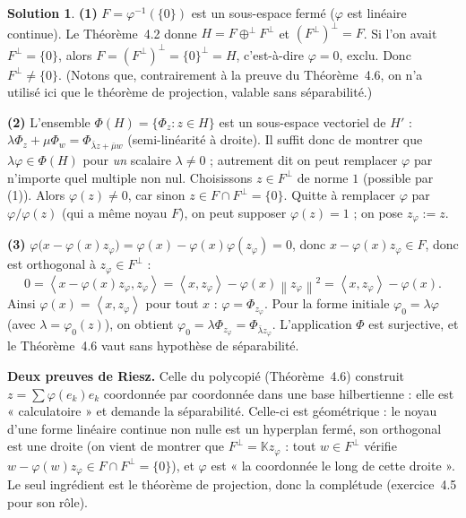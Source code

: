 \documentclass[11pt,a4paper]{article}
\newcommand{\K}{\mathbb{K}}
\newcommand{\norm}[1]{\left\|#1\right\|}
\newcommand{\ie}{c'est-à-dire}
\newcommand{\ps}[2]{\left\langle #1,#2\right\rangle}
\theoremstyle{definition}
\newtheorem*{solution}{Solution}
\begin{document}
\begin{solution}
\noindent\textbf{(1)} $F=\varphi^{-1}(\{0\})$ est un sous-espace fermé ($\varphi$ est linéaire continue). Le Théorème~4.2 donne $H=F\oplus^\perp F^\perp$ et $(F^\perp)^\perp=F$. Si l'on avait $F^\perp=\{0\}$, alors $F=(F^\perp)^\perp=\{0\}^\perp=H$, \ie{} $\varphi=0$, exclu. Donc $F^\perp\ne\{0\}$. (Notons que, contrairement à la preuve du Théorème~4.6, on n'a utilisé ici que le théorème de projection, valable sans séparabilité.)

\medskip
\noindent\textbf{(2)} L'ensemble $\Phi(H)=\{\Phi_z:z\in H\}$ est un sous-espace vectoriel de $H'$ : $\lambda\Phi_z+\mu\Phi_w=\Phi_{\bar\lambda z+\bar\mu w}$ (semi-linéarité à droite). Il suffit donc de montrer que $\lambda\varphi\in\Phi(H)$ pour \emph{un} scalaire $\lambda\ne0$ ; autrement dit on peut remplacer $\varphi$ par n'importe quel multiple non nul. Choisissons $z\in F^\perp$ de norme $1$ (possible par (1)). Alors $\varphi(z)\ne0$, car sinon $z\in F\cap F^\perp=\{0\}$. Quitte à remplacer $\varphi$ par $\varphi/\varphi(z)$ (qui a même noyau $F$), on peut supposer $\varphi(z)=1$ ; on pose $z_\varphi:=z$.

\medskip
\noindent\textbf{(3)} $\varphi\big(x-\varphi(x)z_\varphi\big)=\varphi(x)-\varphi(x)\varphi(z_\varphi)=0$, donc $x-\varphi(x)z_\varphi\in F$, donc est orthogonal à $z_\varphi\in F^\perp$ :
\[
0=\ps{x-\varphi(x)z_\varphi}{z_\varphi}=\ps x{z_\varphi}-\varphi(x)\norm{z_\varphi}^2=\ps x{z_\varphi}-\varphi(x).
\]
Ainsi $\varphi(x)=\ps x{z_\varphi}$ pour tout $x$ : $\varphi=\Phi_{z_\varphi}$. Pour la forme initiale $\varphi_0=\lambda\varphi$ (avec $\lambda=\varphi_0(z)$), on obtient $\varphi_0=\lambda\Phi_{z_\varphi}=\Phi_{\bar\lambda z_\varphi}$. L'application $\Phi$ est surjective, et le Théorème~4.6 vaut sans hypothèse de séparabilité.
\end{solution}

\begin{pointcle}
\textbf{Deux preuves de Riesz.} Celle du polycopié (Théorème~4.6) construit $z=\sum\varphi(e_k)e_k$ coordonnée par coordonnée dans une base hilbertienne : elle est « calculatoire » et demande la séparabilité. Celle-ci est géométrique : le noyau d'une forme linéaire continue non nulle est un hyperplan fermé, son orthogonal est une droite (on vient de montrer que $F^\perp=\K z_\varphi$ : tout $w\in F^\perp$ vérifie $w-\varphi(w)z_\varphi\in F\cap F^\perp=\{0\}$), et $\varphi$ est « la coordonnée le long de cette droite ». Le seul ingrédient est le théorème de projection, donc la complétude (exercice~4.5 pour son rôle).
\end{pointcle}
\end{document}
